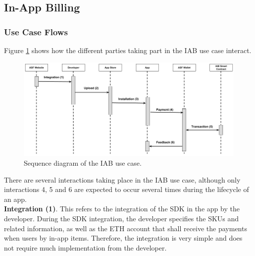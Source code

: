 \subsection{In-App Billing}

\subsubsection{Use Case Flows}

Figure \ref{fig:iab_sequence_diagram} shows how the different parties taking part in the IAB use case interact.

\begin{figure}[H]
\centering
\includegraphics[width=\textwidth]{diagrams/iab_sequence_diagram.png}
\caption{Sequence diagram of the IAB use case.}
\label{fig:iab_sequence_diagram}
\end{figure}

There are several interactions taking place in the IAB use case, although only interactions \textsf{4}, \textsf{5} and \textsf{6} are expected to occur several times during the lifecycle of an app. \\

\noindent \textbf{Integration (1)}. This refers to the integration of the SDK in the app by the developer. During the SDK integration, the developer specifies the SKUs and related information, as well as the ETH account that shall receive the payments when users by in-app items. Therefore, the integration is very simple and does not require much implementation from the developer. \\

